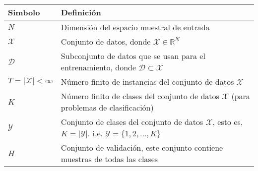 \begin{table}[H]
    \begin{center}
        \begin{tabularx}{\textwidth}{|l|X|}
            \hline
            \textbf{Simbolo}                           & \textbf{Definición}                                                                                                                                                            \\
            \hline %
            $ N $                                      & Dimensión del espacio muestral de entrada                                                                                                                                      \\
            $ \mathcal{X} $                            & Conjunto de datos, donde $\mathcal{X} \in \mathbb{R}^{N}$                                                                                                                      \\
            $ \mathcal{D} $                            & Subconjunto de datos que se usan para el entrenamiento, donde $\mathcal{D} \subset \mathcal{X}$                                                                                \\
            $ T = \lvert \mathcal{X} \rvert < \infty $ & Número finito de instancias del conjunto de datos $\mathcal{X}$                                                                                                                \\
            $ K $                                      & Número finito de clases del conjunto de datos $\mathcal{X}$ (para problemas de clasificación)                                                                                  \\
            $ \mathcal{Y} $                            & Conjunto de clases del conjunto de datos $\mathcal{X}$, esto es, $\textit{K} = \lvert \mathcal{Y} \rvert$. \newline i.e. ${\scriptstyle \mathcal{Y} = \{1,2,...,\textit{K}\}}$ \\
            $ H $                                      & Conjunto de validación, este conjunto contiene muestras de todas las clases                                                                                                    \\

\end{tabularx}
\end{center}
\end{table}

